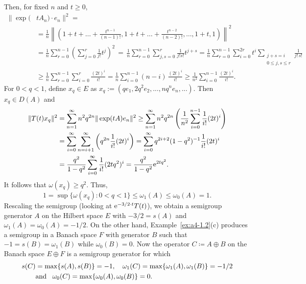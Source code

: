 \begin{example}
Then, for fixed $n$ and $t \geq 0$, 
\begin{align*}
	\|\exp(&t A_n) \cdot e_n\|^2 = \\
	&= \frac{1}{n} \left\| (1 + t + \dots + \frac{t^{n-1}}{(n-1)!}, 1 + t + \dots + \frac{t^{n-2}}{(n-2)!}, \dots, 1+t, 1) \right\|^2 \\
	&=
	\frac{1}{n} \sum_{r=0}^{n-1} \left(\sum_{j=0}^{r} \frac{1}{j!} t^j \right)^2 
	\, = \, \frac{1}{n} \sum_{r=0}^{n-1} \sum_{j,s=0}^{r} \frac{1}{j!s!} t^{j+s} 
	= \frac{1}{n} \sum_{r=0}^{n-1} \sum_{i=0}^{2r} t^i
	\sum_{\substack{j+s=i\\0 \leq j,s \leq r}} \frac{1}{j!\,s!} \\
	& \geq \frac{1}{n} \sum_{r=0}^{n-1} \sum_{i=0}^{r} \frac{(2t)^i}{i!} 
	= \frac{1}{n} \sum_{i=0}^{n-1} (n-i)\,\frac{(2t)^i}{i!} 
	 \geq \frac{1}{n^2} \sum_{i=0}^{n-1} \frac{(2t)^i}{i!}.
\end{align*}
For $ 0 < q < 1 $, define $ x_q \in E $ as  
$
x_q :=  (q e_1, 2q^2 e_2, ..., n q^n e_n, ...).
$
Then $x_q \in D(A)$ and
\begin{align*}
	\|T(t)x_q\|^2 & = \sum_{n=1}^{\infty} n^2 q^{2n} \| \exp(t A) e_n \|^2
	\geq \sum_{n=1}^{\infty} n^2 q^{2n} \left(\frac{1}{n^2} \sum_{i=0}^{n-1}  \frac{1}{i!} (2t)^i \right)\\
	&= \sum_{i=0}^{\infty} \sum_{n=i+1}^{\infty} \left( q^{2n} \frac{1}{i!} (2t)^i \right)
	= \sum_{i=0}^{\infty} q^{2i+2} (1 - q^2)^{-1} \frac{1}{i!} (2t)^i \\
	&= \frac{q^2}{1 - q^2} \sum_{i=0}^{\infty} \frac{1}{i!} (2t q^2)^i
	= \frac{q^2}{1 - q^2} \eu^{2t q^2}.
\end{align*}
It follows that $\omega(x_q) \geq q^2$. 
Thus,
\[
1 = \sup \{\omega(x_q)\colon0 < q < 1\} \leq \omega_1(A) \leq \omega_{0}(A) = 1.
\]
Rescaling the semigroup (\ie looking at $\mathrm{e}^{-3/2 \cdot t} T(t)$), we obtain a semigroup generator $A$ on the Hilbert space $E$ with $-3/2 = s(A)$ and $\omega_1(A) = \omega_{0}(A) = -1/2$. 
On the other hand, Example~\ref{ex:a4-1.2}(c) produces a semigroup in a Banach space $F$ with generator $B$ such that $-1 = s(B) = \omega_1(B)$ while $\omega_{0}(B) = 0$. 
Now the operator $C \coloneq  A \oplus B$ on the Banach space $E \oplus F$ is a semigroup generator for which
\begin{align*}
s(C) &= \max \{s(A), s(B)\} = -1, \quad \omega_1(C) = \max\{\omega_1(A), \omega_1(B)\} = -1/2 \\
& \text{and \phantom{x}} \omega_{0}(C) = \max\{\omega_{0}(A), \omega_{0}(B)\} = 0.
\end{align*}
\end{example}
